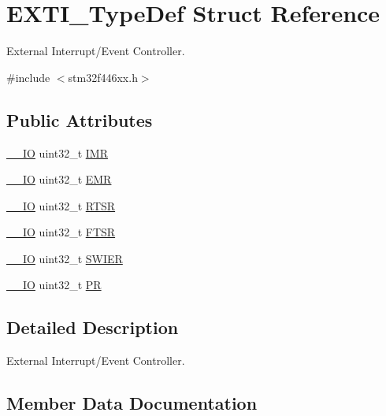 \hypertarget{struct_e_x_t_i___type_def}{}\section{E\+X\+T\+I\+\_\+\+Type\+Def Struct Reference}
\label{struct_e_x_t_i___type_def}


External Interrupt/\+Event Controller.  




{\ttfamily \#include $<$stm32f446xx.\+h$>$}

\subsection*{Public Attributes}
\begin{DoxyCompactItemize}
\item 
\hyperlink{core__sc300_8h_aec43007d9998a0a0e01faede4133d6be}{\+\_\+\+\_\+\+IO} uint32\+\_\+t \hyperlink{struct_e_x_t_i___type_def_a17d061db586d4a5aa646b68495a8e6a4}{I\+MR}
\item 
\hyperlink{core__sc300_8h_aec43007d9998a0a0e01faede4133d6be}{\+\_\+\+\_\+\+IO} uint32\+\_\+t \hyperlink{struct_e_x_t_i___type_def_a9c5bff67bf9499933959df7eb91a1bd6}{E\+MR}
\item 
\hyperlink{core__sc300_8h_aec43007d9998a0a0e01faede4133d6be}{\+\_\+\+\_\+\+IO} uint32\+\_\+t \hyperlink{struct_e_x_t_i___type_def_ac019d211d8c880b327a1b90a06cc0675}{R\+T\+SR}
\item 
\hyperlink{core__sc300_8h_aec43007d9998a0a0e01faede4133d6be}{\+\_\+\+\_\+\+IO} uint32\+\_\+t \hyperlink{struct_e_x_t_i___type_def_aee667dc148250bbf37fdc66dc4a9874d}{F\+T\+SR}
\item 
\hyperlink{core__sc300_8h_aec43007d9998a0a0e01faede4133d6be}{\+\_\+\+\_\+\+IO} uint32\+\_\+t \hyperlink{struct_e_x_t_i___type_def_a5c1f538e64ee90918cd158b808f5d4de}{S\+W\+I\+ER}
\item 
\hyperlink{core__sc300_8h_aec43007d9998a0a0e01faede4133d6be}{\+\_\+\+\_\+\+IO} uint32\+\_\+t \hyperlink{struct_e_x_t_i___type_def_a133294b87dbe6a01e8d9584338abc39a}{PR}
\end{DoxyCompactItemize}


\subsection{Detailed Description}
External Interrupt/\+Event Controller. 

\subsection{Member Data Documentation}
